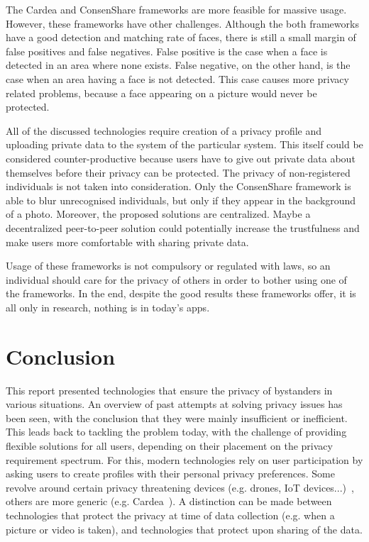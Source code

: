 \documentclass[conference]{IEEEtran}
\begin{document}
The Cardea and ConsenShare frameworks are more feasible for massive usage. However, these frameworks have other challenges. Although the both frameworks have a good detection and matching rate of faces, there is still a small margin of false positives and false negatives. False positive is the case when a face is detected in an area where none exists. False negative, on the other hand, is the case when an area having a face is not detected. This case causes more privacy related problems, because a face appearing on a picture would never be protected. 

All of the discussed technologies require creation of a privacy profile and uploading private data to the system of the particular system. This itself could be considered counter-productive because users have to give out private data about themselves before their privacy can be protected. The privacy of non-registered individuals is not taken into consideration. Only the ConsenShare framework is able to blur unrecognised individuals, but only if they appear in the background of a photo. Moreover, the proposed solutions are centralized. Maybe a decentralized peer-to-peer solution could potentially increase the trustfulness and make users more comfortable with sharing private data.

Usage of these frameworks is not compulsory or regulated with laws, so an individual should care for the privacy of others in order to bother using one of the frameworks. In the end, despite the good results these frameworks offer, it is all only in research, nothing is in today's apps.


\section{Conclusion}\label{Conclusion}
This report presented technologies that ensure the privacy of bystanders in various situations. An overview of past attempts at solving privacy issues has been seen, with the conclusion that they were mainly insufficient or inefficient. This leads back to tackling the problem today, with the challenge of providing flexible solutions for all users, depending on their placement on the privacy requirement spectrum. For this, modern technologies rely on user participation by asking users to create profiles with their personal privacy preferences. Some revolve around certain privacy threatening devices (e.g. drones, \ac{IoT} devices...)~\cite{yao2017privacy, bernd2020bystanders}, others are more generic (e.g. Cardea~\cite{shu2016cardea}). A distinction can be made between technologies that protect the privacy at time of data collection (e.g. when a picture or video is taken), and technologies that protect upon sharing of the data.
\end{document}
